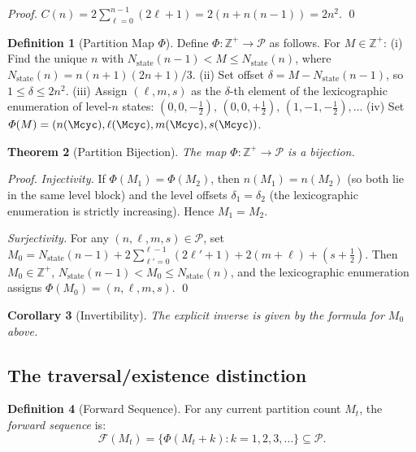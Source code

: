 \documentclass[twocolumn,10pt,a4paper]{article}
\theoremstyle{thmstyle}
\newtheorem{theorem}{Theorem}[section]
\newtheorem{corollary}[theorem]{Corollary}
\theoremstyle{definition}
\newtheorem{definition}[theorem]{Definition}
\theoremstyle{remark}
\newcommand{\Zp}{\mathbb{Z}^{+}}
\newcommand{\Parts}{\mathcal{P}}
\newcommand{\PhiMap}{\varPhi}
\newcommand{\calF}{\mathcal{F}}
\begin{document}
\begin{proof}
$C(n) = 2\sum_{\ell=0}^{n-1}(2\ell+1) = 2(n + n(n-1)) = 2n^2$. \qed
\end{proof}

\begin{definition}[Partition Map $\PhiMap$]
\label{def:phi}
Define $\PhiMap: \Zp \to \Parts$ as follows. For $M \in \Zp$:
(i) Find the unique $n$ with $N_{\text{state}}(n-1) < M \leq N_{\text{state}}(n)$,
where $N_{\text{state}}(n) = n(n+1)(2n+1)/3$.
(ii) Set offset $\delta = M - N_{\text{state}}(n-1)$, so $1 \leq \delta \leq 2n^2$.
(iii) Assign $(\ell, m, s)$ as the $\delta$-th element of the lexicographic
enumeration of level-$n$ states:
$(0,0,-\tfrac{1}{2}),\,(0,0,+\tfrac{1}{2}),\,(1,-1,-\tfrac{1}{2}),\ldots$
(iv) Set $\PhiMap(M) = (n(\Mcyc), \ell(\Mcyc), m(\Mcyc), s(\Mcyc))$.
\end{definition}

\begin{theorem}[Partition Bijection]
\label{thm:bijection}
The map $\PhiMap: \Zp \to \Parts$ is a bijection.
\end{theorem}

\begin{proof}
\textit{Injectivity.} If $\PhiMap(M_1) = \PhiMap(M_2)$, then
$n(M_1) = n(M_2)$ (so both lie in the same level block) and the
level offsets $\delta_1 = \delta_2$ (the lexicographic enumeration
is strictly increasing). Hence $M_1 = M_2$.

\textit{Surjectivity.} For any $(n,\ell,m,s) \in \Parts$, set
$M_0 = N_{\text{state}}(n-1) + 2\sum_{\ell'=0}^{\ell-1}(2\ell'+1) + 2(m+\ell) + (s+\tfrac{1}{2})$.
Then $M_0 \in \Zp$, $N_{\text{state}}(n-1) < M_0 \leq N_{\text{state}}(n)$,
and the lexicographic enumeration assigns $\PhiMap(M_0) = (n,\ell,m,s)$.
\qed
\end{proof}

\begin{corollary}[Invertibility]
The explicit inverse is given by the formula for $M_0$ above.
\end{corollary}

\subsection{The traversal/existence distinction}

\begin{definition}[Forward Sequence]
For any current partition count $M_t$, the \emph{forward sequence} is:
\begin{equation}
\calF(M_t) = \{\PhiMap(M_t + k) : k = 1, 2, 3, \ldots\} \subseteq \Parts.
\label{eq:forward}
\end{equation}
\end{definition}
\end{document}
